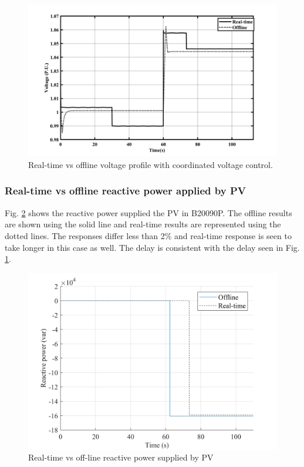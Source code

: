 \begin{figure}[!h]
\centering
\includegraphics[width=\linewidth]{figs/OFF_VS_RT.png}
\caption{Real-time vs offline voltage profile with coordinated voltage control.}
\label{fig:RT_VS_OFF_V}
\end{figure}
\subsubsection{Real-time vs offline reactive power applied by PV}
Fig. \ref{fig:RT_PQ} shows the reactive power supplied the PV in B20090P. The offline results are shown using the solid line and real-time results are represented using the dotted lines. The responses differ less than 2\% and real-time response is seen to take longer in this case as well. The delay is consistent with the delay seen in Fig. \ref{fig:RT_VS_OFF_V}.

\begin{figure}[!h]
\centering
\includegraphics[width=\linewidth]{figs/PQ_RT.png}
\caption{Real-time vs off-line reactive power supplied by PV}
\label{fig:RT_PQ}
\end{figure}

